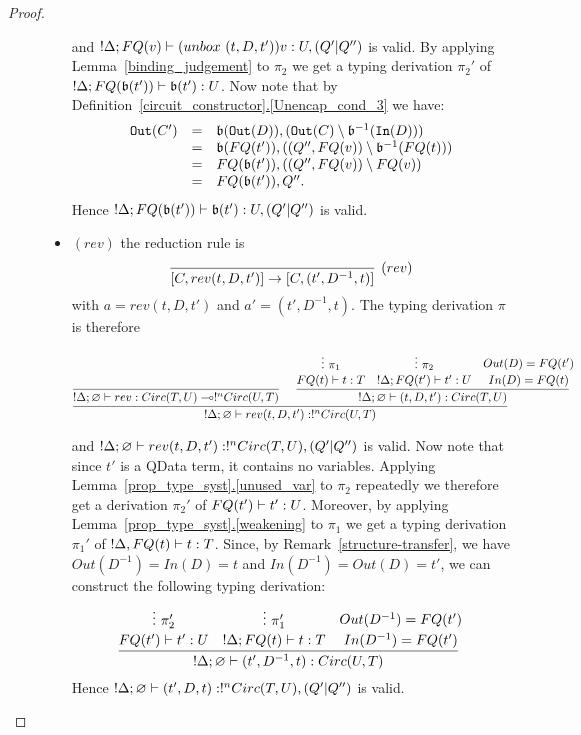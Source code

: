 \documentclass{article}
\begin{document}
\begin{proof}
\begin{description}
\begin{itemize}
  and $!\Delta; FQ(v)\vdash (unbox~(t,D,t'))v :U,(Q'|Q'')$ 
  is valid. By applying
  Lemma~\hyperref[binding_judgement]{\ref*{binding_judgement}} 
  to $\pi_2$ we get a typing derivation $\pi_2'$ of 
  $!\Delta;FQ(\mathfrak{b}(t'))\vdash \mathfrak{b}(t'):U$.
  Now note that by 
  Definition~\hyperref[Unencap_cond_3]{\ref*{circuit_constructor}.\ref*{Unencap_cond_3}} 
  we have:
  \[
  \begin{array}{rcl}
  \mathtt{Out}(C') & = & \mathfrak{b}(\mathtt{Out}(D)), (\mathtt{Out}(C)\setminus\mathfrak{b}^{-1}(\mathtt{In}(D))) \\
                   & = & \mathfrak{b}(FQ(t')) , ((Q'',FQ(v))\setminus \mathfrak{b}^{-1}(FQ(t))) \\
                   & = & FQ(\mathfrak{b}(t')) , ((Q'',FQ(v))\setminus FQ(v)) \\
                   & = & FQ(\mathfrak{b}(t')),Q''.                   
  \end{array}
  \]
  Hence $!\Delta; FQ(\mathfrak{b}(t'))\vdash \mathfrak{b}(t') :U,(Q'|Q'')$  is valid.
  \item $(rev)$ the reduction rule is
  \[
    \infer[(rev)]{[C,rev (t,D,t')]\to [C,(t',D^{-1},t)]}{}
  \]
  with $a=rev(t,D,t')$ and $a'=(t',D^{-1},t)$. The typing derivation $\pi$ 
  is therefore
  \begin{changemargin}{-2.7cm}{-1.6cm}
  \[
  \infer[]{!\Delta;\varnothing\entails rev(t,D,t'):!^nCirc(U,T)}{
    \infer[]{!\Delta;\varnothing \entails rev:Circ(T,U)\loli !^nCirc(U,T)}{
    }   
    &
    \infer[]{!\Delta ;\varnothing\entails (t,D,t'):Circ(T,U)}{
      \deduce[]{FQ(t)\entails t:T}{
        \vdots ~\pi_1
      }
      &
      \deduce[]{!\Delta;FQ(t')\entails t':U}{
        \vdots ~\pi_2     
      }
      &
      \deduce[]{In(D)=FQ(t)}{
        Out(D)=FQ(t')
      }
    }
  }
  \]
  \end{changemargin}
  and $!\Delta;\varnothing\vdash rev(t,D,t'):!^nCirc(T,U),(Q'|Q'')$ is 
  valid. Now note that since $t'$ is a QData term, it contains no variables. 
  Applying Lemma~\hyperref[unused_var]{\ref*{prop_type_syst}.\ref*{unused_var}} 
  to $\pi_2$ repeatedly we therefore get a derivation $\pi_2'$ of 
  $FQ(t')\vdash t':U$. Moreover, by applying
  Lemma~\hyperref[weakening]{\ref*{prop_type_syst}.\ref*{weakening}} to $\pi_1$ 
  we get a typing derivation $\pi_1'$ of $!\Delta ,FQ(t)\vdash t:T$.
  Since, by 
  Remark~\hyperref[structure-transfer]{\ref*{structure-transfer}}, 
  we have $Out(D^{-1})=In(D)=t$ and $In(D^{-1})=Out(D)=t'$, we can construct 
  the following typing derivation:
  \[
  \infer[]{!\Delta ;\varnothing\entails (t',D^{-1},t):Circ(U,T)}{
    \deduce[]{FQ(t')\entails t':U}{
      \vdots ~\pi_2'
    }
    &
    \deduce[]{!\Delta;FQ(t)\entails t:T}{
      \vdots ~\pi_1'     
    }
    &
    \deduce[]{In(D^{-1})=FQ(t')}{
      Out(D^{-1})=FQ(t')
    }
  }  
  \]
  Hence $!\Delta;\varnothing\vdash (t',D,t):!^nCirc(T,U),(Q'|Q'')$ 
  is valid.    
\end{itemize}
\end{description}
\end{proof}
\end{document}
